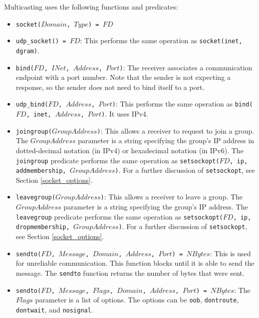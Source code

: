 Multicasting uses the following functions and predicates:
\begin{itemize}
\item \texttt{socket($Domain$, $Type$) = $FD$} 
\item \texttt{udp\_socket() = $FD$}: This performs the same operation as \texttt{socket(inet, dgram)}. 
\item \texttt{bind($FD$, $INet$, $Address$, $Port$)}: The receiver associates a communication endpoint with a port number.  Note that the sender is not expecting a response, so the sender does not need to bind itself to a port. 
\item \texttt{udp\_bind($FD$, $Address$, $Port$)}: This performs the same operation as \texttt{bind($FD$, inet, $Address$, $Port$)}.  It uses IPv4.
\item \texttt{joingroup($GroupAddress$)}: This allows a receiver to request to join a group.  The $GroupAddress$ parameter is a string specifying the group's IP address in dotted-decimal notation (in IPv4) or hexadecimal notation (in IPv6).  The \texttt{joingroup} predicate performs the same operation as \texttt{setsockopt($FD$, ip, addmembership, $GroupAddress$)}.  For a further discussion of \texttt{setsockopt}, see Section \ref{socket_options}.
\item \texttt{leavegroup($GroupAddress$)}: This allows a receiver to leave a group.  The $GroupAddress$ parameter is a string specifying the group's IP address.  The \texttt{leavegroup} predicate performs the same operation as \texttt{setsockopt($FD$, ip, dropmembership, $GroupAddress$)}.  For a further discussion of \texttt{setsockopt}, see Section \ref{socket_options}.
\item \texttt{sendto($FD$, $Message$, $Domain$, $Address$, $Port$) = $NBytes$}: This is used for unreliable communication.  This function blocks until it is able to send the message.  The \texttt{sendto} function returns the number of bytes that were sent.  
\item \texttt{sendto($FD$, $Message$, $Flags$, $Domain$, $Address$, $Port$) = $NBytes$}: The $Flags$ parameter is a list of options. The options can be \texttt{oob}, \texttt{dontroute}, \texttt{dontwait}, and \texttt{nosignal}.

\end{itemize}
